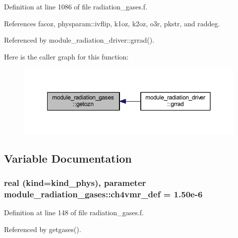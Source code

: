 Definition at line 1086 of file radiation\+\_\+gases.\+f.



References facoz, physparam\+::ivflip, k1oz, k2oz, o3r, pkstr, and raddeg.



Referenced by module\+\_\+radiation\+\_\+driver\+::grrad().



Here is the caller graph for this function\+:\nopagebreak
\begin{figure}[H]
\begin{center}
\leavevmode
\includegraphics[width=350pt]{namespacemodule__radiation__gases_af4be311f1ec1601a167655c1632d66de_icgraph}
\end{center}
\end{figure}




\subsection{Variable Documentation}
\subsubsection[{\texorpdfstring{ch4vmr\+\_\+def}{ch4vmr_def}}]{\setlength{\rightskip}{0pt plus 5cm}real (kind=kind\+\_\+phys), parameter module\+\_\+radiation\+\_\+gases\+::ch4vmr\+\_\+def = 1.\+50e-\/6\hspace{0.3cm}{\ttfamily [private]}}\hypertarget{namespacemodule__radiation__gases_aad928d9e0064905a0b6e1eb8bb59bd23}{}\label{namespacemodule__radiation__gases_aad928d9e0064905a0b6e1eb8bb59bd23}


Definition at line 148 of file radiation\+\_\+gases.\+f.



Referenced by getgases().

